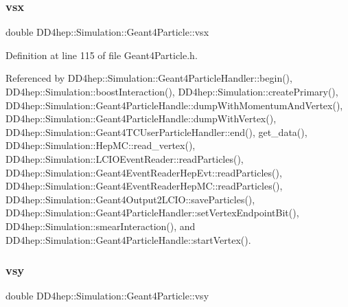 \hypertarget{class_d_d4hep_1_1_simulation_1_1_geant4_particle_a3687f6d18f29f056fda968cfccd8251a}{}\label{class_d_d4hep_1_1_simulation_1_1_geant4_particle_a3687f6d18f29f056fda968cfccd8251a} 
\subsubsection{\texorpdfstring{vsx}{vsx}}
{\footnotesize\ttfamily double D\+D4hep\+::\+Simulation\+::\+Geant4\+Particle\+::vsx}



Definition at line 115 of file Geant4\+Particle.\+h.



Referenced by D\+D4hep\+::\+Simulation\+::\+Geant4\+Particle\+Handler\+::begin(), D\+D4hep\+::\+Simulation\+::boost\+Interaction(), D\+D4hep\+::\+Simulation\+::create\+Primary(), D\+D4hep\+::\+Simulation\+::\+Geant4\+Particle\+Handle\+::dump\+With\+Momentum\+And\+Vertex(), D\+D4hep\+::\+Simulation\+::\+Geant4\+Particle\+Handle\+::dump\+With\+Vertex(), D\+D4hep\+::\+Simulation\+::\+Geant4\+T\+C\+User\+Particle\+Handler\+::end(), get\+\_\+data(), D\+D4hep\+::\+Simulation\+::\+Hep\+M\+C\+::read\+\_\+vertex(), D\+D4hep\+::\+Simulation\+::\+L\+C\+I\+O\+Event\+Reader\+::read\+Particles(), D\+D4hep\+::\+Simulation\+::\+Geant4\+Event\+Reader\+Hep\+Evt\+::read\+Particles(), D\+D4hep\+::\+Simulation\+::\+Geant4\+Event\+Reader\+Hep\+M\+C\+::read\+Particles(), D\+D4hep\+::\+Simulation\+::\+Geant4\+Output2\+L\+C\+I\+O\+::save\+Particles(), D\+D4hep\+::\+Simulation\+::\+Geant4\+Particle\+Handler\+::set\+Vertex\+Endpoint\+Bit(), D\+D4hep\+::\+Simulation\+::smear\+Interaction(), and D\+D4hep\+::\+Simulation\+::\+Geant4\+Particle\+Handle\+::start\+Vertex().

\hypertarget{class_d_d4hep_1_1_simulation_1_1_geant4_particle_a59b9d6e764aa6ea6c2cf011aba056c29}{}\label{class_d_d4hep_1_1_simulation_1_1_geant4_particle_a59b9d6e764aa6ea6c2cf011aba056c29} 
\subsubsection{\texorpdfstring{vsy}{vsy}}
{\footnotesize\ttfamily double D\+D4hep\+::\+Simulation\+::\+Geant4\+Particle\+::vsy}



